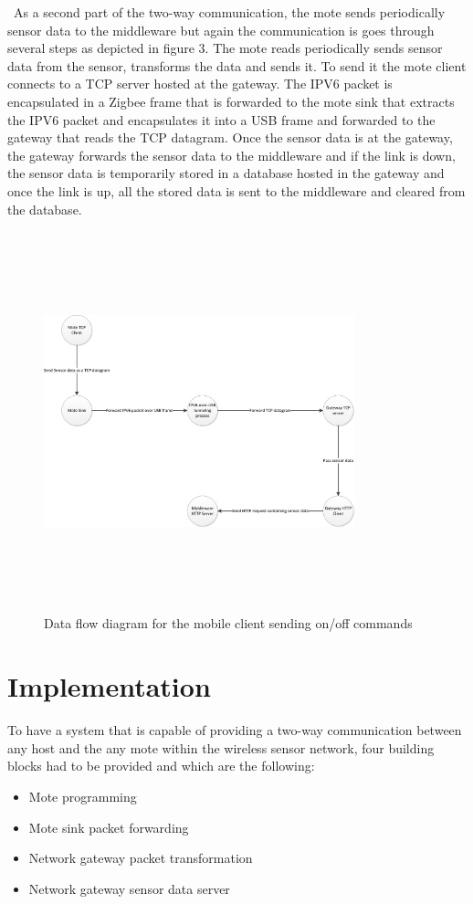 \documentclass[conference]{IEEEtran}
\begin{document}
\
As a second part of the two-way communication, the mote sends periodically sensor data to the middleware but again the communication is goes through several steps as depicted in figure 3.
\linebreak 
The mote reads periodically sends sensor data from the sensor, transforms the data and sends it. To send it the mote client connects to a TCP server hosted at the gateway. The IPV6 packet is encapsulated in a Zigbee frame that is forwarded to the mote  sink that extracts the IPV6 packet and  encapsulates it into a USB frame and forwarded to the gateway that reads the TCP datagram. Once the sensor data is at the gateway, the gateway forwards the sensor data to the middleware and if the link is down, the sensor data is temporarily stored in a database hosted in the gateway and once the link is up, all the stored data is sent to the middleware and cleared from the database.



\begin{figure}[htbp]
\centering
\includegraphics[height=110mm,width=90mm]{images/send_sensor_data_data_flow.jpg}
\caption{Data flow diagram for the mobile client sending on/off commands}
\label{fig:control_appliance}
\end{figure}


\section{Implementation}
To have a system that is capable of providing a two-way communication between any host and the any mote within the wireless sensor network, four building blocks had to be provided and which are the following:
\begin{itemize}
\item Mote programming
\item Mote sink packet forwarding
\item Network gateway packet transformation
\item Network gateway sensor data server
\end{itemize}
\end{document}
